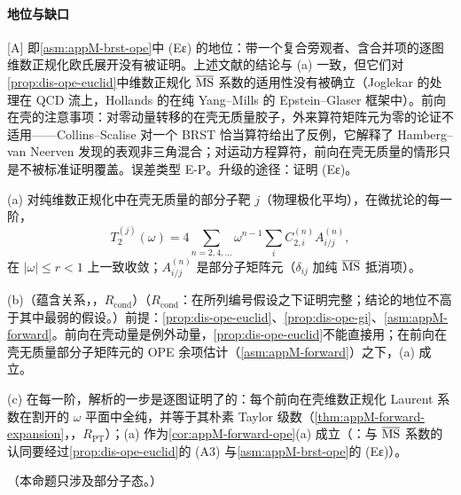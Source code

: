 \paragraph{地位与缺口}
[A] 即\cref{asm:appM-brst-ope}中 (Eε) 的地位：带一个复合旁观者、含合并项的逐图维数正规化欧氏展开没有被证明。上述文献的结论与 (a) 一致，但它们对\cref{prop:dis-ope-euclid}中维数正规化 $\overline{\rm MS}$ 系数的适用性没有被确立（Joglekar 的处理在 QCD 流上，Hollands 的在纯 Yang--Mills 的 Epstein--Glaser 框架中）。前向在壳的注意事项：对零动量转移的在壳无质量胶子，外来算符矩阵元为零的论证不适用——Collins--Scalise 对一个 BRST 恰当算符给出了反例\cite{Collins:1994ee}，它解释了 Hamberg--van Neerven 发现的表观非三角混合\cite{Hamberg:1991qt}；对运动方程算符，前向在壳无质量的情形只是不被标准证明覆盖。误差类型 E-P。升级的途径：证明 (Eε)。

\begin{proposition}\label{prop:dis-ope-forward}
(a) 对纯维数正规化中在壳无质量的部分子靶 $j$（物理极化平均），在微扰论的每一阶，
\begin{equation}\label{eq:dis-forward-ope}
T_2^{(j)}(\omega)=4\sum_{n=2,4,\dots}\omega^{n-1}\sum_iC^{(n)}_{2,i}A^{(n)}_{i/j},
\end{equation}
在 $|\omega|\le r<1$ 上一致收敛；$A^{(n)}_{i/j}$ 是部分子矩阵元（$\delta_{ij}$ 加纯 $\overline{\rm MS}$ 抵消项）。
\par
(b)（蕴含关系，\tagR，$R_{\mathrm{cond}}$）（$R_{\mathrm{cond}}$：在所列编号假设之下证明完整；结论的地位不高于其中最弱的假设。）前提：\cref{prop:dis-ope-euclid}、\cref{prop:dis-ope-gi}、\cref{asm:appM-forward}。前向在壳动量是例外动量，\cref{prop:dis-ope-euclid}不能直接用；在前向在壳无质量部分子矩阵元的 OPE 余项估计（\cref{asm:appM-forward}）之下，(a) 成立。
\par
(c) 在每一阶，解析的一步是逐图证明了的：每个前向在壳维数正规化 Laurent 系数在割开的 $\omega$ 平面中全纯，并等于其朴素 Taylor 级数（\cref{thm:appM-forward-expansion}，\tagR，$R_{\mathrm{PT}}$）；(a) 作为\cref{cor:appM-forward-ope}(a) 成立（\tagA：与 $\overline{\rm MS}$ 系数的认同要经过\cref{prop:dis-ope-euclid}的 (A3) 与\cref{asm:appM-brst-ope}的 (Eε)）。
\par
（本命题只涉及部分子态。）
\end{proposition}

